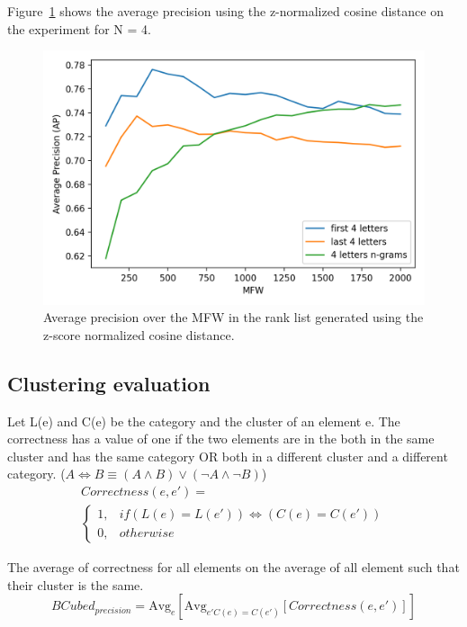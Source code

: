 Figure~\ref{fig:first_last_letters_ngrams} shows the average precision using the z-normalized cosine distance on the experiment for N = 4.

\begin{figure}
  \includegraphics[width=\linewidth]{img/first_last_letters_ngrams.png}
  \caption{Average precision over the MFW in the rank list generated using the z-score normalized cosine distance.}
  \label{fig:first_last_letters_ngrams}
\end{figure}

\subsection{Clustering evaluation}

\begin{definition}
  Let L(e) and C(e) be the category and the cluster of an element e.
  The correctness has a value of one if the two elements are in the both in the same cluster and has the same category OR both in a different cluster and a different category. ($A \Longleftrightarrow B \equiv (A \land B) \lor (\neg A \land \neg B)$)
  \begin{gather*}
    Correctness(e, e') = \\
    \begin{cases}
      1, & if (L(e) = L(e')) \Longleftrightarrow (C(e) = C(e'))\\
      0, & otherwise
    \end{cases}
  \end{gather*}
\end{definition}

\begin{definition}
  The average of correctness for all elements on the average of all element such that their cluster is the same.
  \begin{equation}
    BCubed_{precision} = \text{Avg}_{e}[\text{Avg}_{e' C(e)=C(e')}[Correctness(e, e')]]
  \end{equation}
\end{definition}

